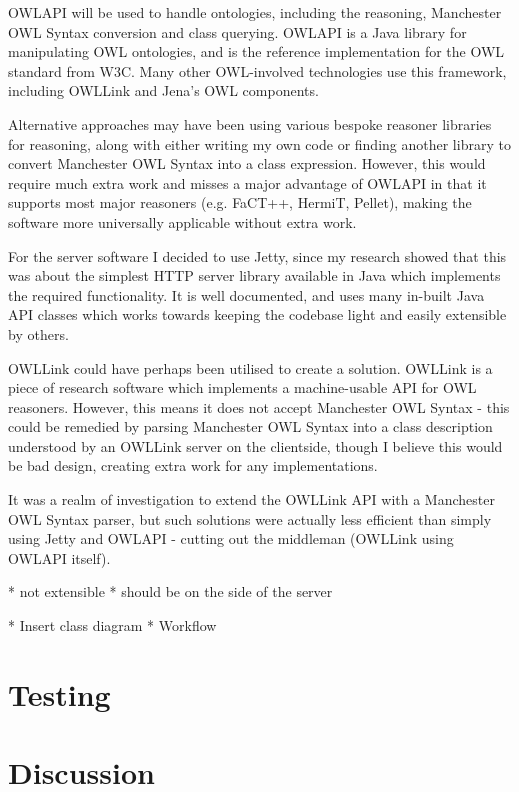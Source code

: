 \documentclass{article}
\begin{document}
OWLAPI will be used to handle ontologies, including the reasoning, Manchester
OWL Syntax conversion and class querying. OWLAPI is a Java library for
manipulating OWL ontologies, and is the reference implementation for the OWL
standard from W3C. Many other OWL-involved technologies use this framework,
including OWLLink and Jena's OWL components.

Alternative approaches may have been using various bespoke reasoner libraries
for reasoning, along with either writing my own code or finding another library
to convert Manchester OWL Syntax into a class expression. However, this would
require much extra work and misses a major advantage of OWLAPI in that it
supports most major reasoners (e.g. FaCT++, HermiT, Pellet), making the software
more universally applicable without extra work.

For the server software I decided to use Jetty, since my research showed that
this was about the simplest HTTP server library available in Java which
implements the required functionality. It is well documented, and uses many
in-built Java API classes which works towards keeping the codebase light and
easily extensible by others. 

OWLLink could have perhaps been utilised to create a solution. OWLLink is a
piece of research software which implements a machine-usable API for OWL
reasoners. However, this means it does not accept Manchester OWL Syntax - this
could be remedied by parsing Manchester OWL Syntax into a class description
understood by an OWLLink server on the clientside, though I believe this would
be bad design, creating extra work for any implementations. 

It was a realm of investigation to extend the OWLLink API with a Manchester OWL 
Syntax parser, but such solutions were actually less efficient than simply using
Jetty and OWLAPI - cutting out the middleman (OWLLink using OWLAPI itself).

* not extensible
* should be on the side of the server

* Insert class diagram
* Workflow

\section{Testing}

\section{Discussion}
\end{document}
